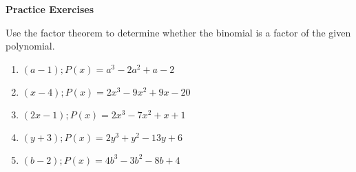 \textbf{Practice Exercises}

\vspce

Use the factor theorem to determine whether the binomial is a factor of the given polynomial. 


\begin{enumerate}[label = \arabic*. ]

\item \hspce $(a-1); P(x) = a^3-2a^2+a-2$
\vspce
\item \hspce $(x-4); P(x) = 2x^3-9x^2+9x-20$
\vspce
\item \hspce $(2x-1); P(x) = 2x^3-7x^2+x+1$
\vspce
\item \hspce $(y+3); P(x) = 2y^3+y^2-13y+6$
\vspce
\item \hspce $(b-2); P(x) = 4b^3-3b^2-8b+4$


\end{enumerate}
